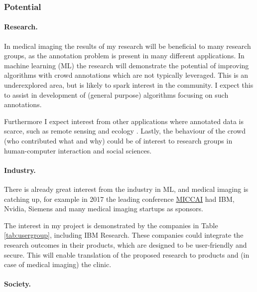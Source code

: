 \documentclass[serif, twocolumn, numeric, rga]{jote-article}
\begin{document}
\subsubsection*{Potential}

\paragraph{Research.}

\noindent In medical imaging the results of my research will be beneficial to many research groups, as the annotation problem is present in many different applications. In machine learning (ML) the research will demonstrate the potential of improving algorithms with crowd annotations which are not typically leveraged. This is an underexplored area, but is likely to spark interest in the community. I expect this to assist in development of (general purpose) algorithms focusing on such annotations.

Furthermore I expect interest from other applications where annotated data is scarce, such as remote sensing \cite{Fritz2009} and ecology \cite{Fink2014}.
Lastly, the behaviour of the crowd (who contributed what and why) could be of interest to research groups in human-computer interaction \cite{Mao2013}
and social sciences.

\paragraph{Industry.} 

\noindent There is already great interest from the industry in ML, and medical imaging is catching up, for example in 2017 the leading conference \href{http://www.miccai2017.org/partners}{MICCAI} had IBM, Nvidia, Siemens and many medical imaging startups as sponsors.

The interest in my project is demonstrated by the companies in Table \ref{tab:usergroup}, including IBM Research. These companies could integrate the research outcomes in their products, which are designed to be user-friendly and secure. This will enable translation of the proposed research to products and (in case of medical imaging) the clinic.

\paragraph{Society.}
\end{document}
